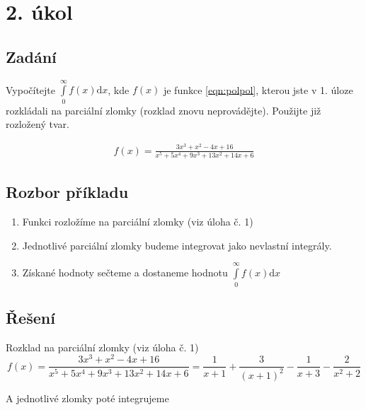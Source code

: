 \section{2. úkol}
\subsection*{Zadání}
 Vypočítejte  $\int\limits_0^\infty f(x) \mathrm{d}x$, kde $f(x)$ je funkce \ref{eqn:polpol}, kterou jste v 1. úloze rozkládali na parciální zlomky (rozklad znovu neprovádějte). Použijte již rozložený tvar.

 \begin{eqnarray}
f(x)=\frac{3x^3+x^2-4x+16}{x^5+5x^4+9x^3+13x^2+14x+6}
\label{eqn:polpol}
\end{eqnarray}

\subsection*{Rozbor příkladu}
\begin{enumerate}
\item Funkci rozložíme na parciální zlomky (viz úloha č. 1)
\item Jednotlivé parciální zlomky budeme integrovat jako nevlastní integrály.
\item Získané hodnoty sečteme a dostaneme hodnotu $\int\limits_0^\infty f(x) \mathrm{d}x$
\end{enumerate}

\subsection*{Řešení}
\noindent Rozklad na parciální zlomky (viz úloha č. 1)
\begin{displaymath}
f(x)=
\frac{3x^3+x^2-4x+16}{x^5+5x^4+9x^3+13x^2+14x+6} 
= 
\frac{1}{x+1} +
\frac{3}{(x+1)^2} -
\frac{1}{x+3} -
\frac{2}{x^2+2}
\end{displaymath}

\noindent A jednotlivé zlomky poté integrujeme

